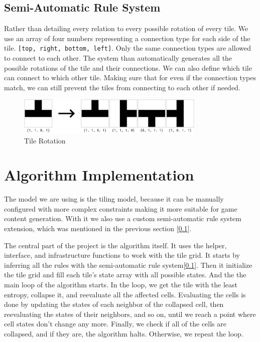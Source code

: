 \documentclass[10pt,oneside,a4paper]{article}
\begin{document}
\subsection{Semi-Automatic Rule System}\label{sec:semi-automatic_rule_system}
Rather than detailing every relation to every possible rotation of every tile. We use an array of four numbers representing a connection type for each side of the tile. \texttt{[top, right, bottom, left]}.
Only the same connection types are allowed to connect to each other.
The system than automatically generates all the possible rotations of the tile and their connections.
We can also define which tile can connect to which other tile. Making sure that for even if the connection types match, we can still prevent the tiles from connecting to each other if needed.

\begin{figure}[ht]
    \centering
    \includegraphics[width=0.8\textwidth]{figures/tile_rotation_example.png}
    \caption{Tile Rotation}\label{fig:tile_rotation_example}
\end{figure}


\section{Algorithm Implementation}\label{sec:implementation}
The model we are using is the tiling model, because it can be manually configured with more complex constraints making it more suitable for game content generation.
With it we also use a custom semi-automatic rule system extension, which was mentioned in the previous section [\ref*{sec:semi-automatic_rule_system}].

The central part of the project is the algorithm itself.
It uses the helper, interface, and infrastructure functions to work with the tile grid.
It starts by inferring all the rules with the semi-automatic rule system[\ref*{sec:semi-automatic_rule_system}].
Then it initialize the tile grid and fill each tile's state array with all possible states.
And the the main loop of the algorithm starts.
In the loop, we get the tile with the least entropy, collapse it, and reevaluate all the affected cells.
Evaluating the cells is done by updating the states of each neighbor of the collapsed cell, then reevaluating the states of their neighbors, and so on, until we reach a point where cell states don't change any more.
Finally, we check if all of the cells are collapsed, and if they are, the algorithm halts.
Otherwise, we repeat the loop.
\end{document}
